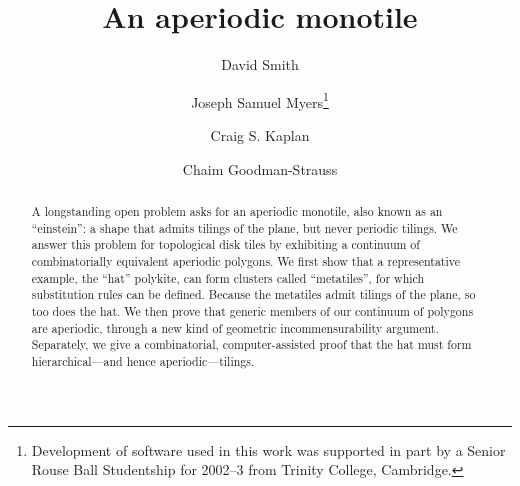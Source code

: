 \documentclass[12pt]{article}
\title{An aperiodic monotile}
\author[1]{David Smith}
\author[2]{Joseph Samuel Myers\thanks{Development of software used in
    this work was supported in part by a Senior Rouse Ball Studentship
    for 2002--3 from Trinity College, Cambridge.}}
\author[3]{Craig S. Kaplan}
\author[4]{Chaim Goodman-Strauss}
\affil[1]{%
Yorkshire, UK

\email{ds.orangery@gmail.com}%
}
\affil[2]{%
Cambridge, UK

\email{jsm@polyomino.org.uk}%
}
\affil[3]{%
School of Computer Science, University of Waterloo, Waterloo, Ontario, Canada

\email{csk@uwaterloo.ca}%
}
\affil[4]{%
National Museum of Mathematics, New York, New York, U.S.A.\par University of Arkansas, Fayetteville, Arkansas, U.S.A.

\email{chaimgoodmanstrauss@gmail.com}%
}
\begin{document}


\maketitle


\begin{abstract}
  A longstanding open problem asks for an aperiodic monotile, also known
  as an ``einstein'': a shape 
  that admits tilings of the plane, but never periodic tilings.
  We answer this problem for topological disk tiles by exhibiting a continuum of 
  combinatorially equivalent aperiodic polygons.
  We first show that a representative example, the ``hat''
  polykite, can form clusters called ``metatiles'', for which substitution
  rules can be defined.  Because the metatiles admit tilings of
  the plane, so too does the hat.  We then prove that generic members
  of our continuum of polygons are aperiodic, through a new kind of
  geometric incommensurability argument.  Separately, we give a combinatorial,
  computer-assisted proof that the hat must form hierarchical---and hence
  aperiodic---tilings.  
\end{abstract}










\end{document}
